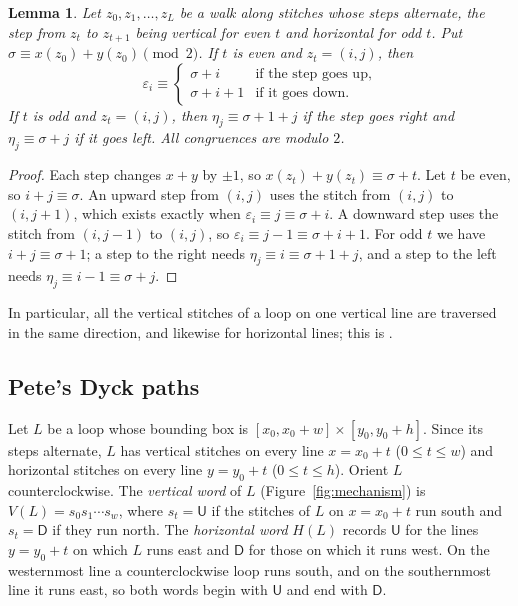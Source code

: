 \documentclass[11pt]{amsart}
\newtheorem{lemma}[theorem]{Lemma}
\theoremstyle{definition}
\theoremstyle{remark}
\newcommand{\U}{\mathsf{U}}
\newcommand{\D}{\mathsf{D}}
\begin{document}
\begin{lemma}\label{lem:walk}
Let $z_0,z_1,\dots,z_L$ be a walk along stitches whose steps alternate, the step from $z_t$ to
$z_{t+1}$ being vertical for even $t$ and horizontal for odd $t$. Put
$\sigma\equiv x(z_0)+y(z_0)\pmod 2$. If $t$ is even and $z_t=(i,j)$, then
\[
\varepsilon_i\equiv\begin{cases}\sigma+i&\text{if the step goes up,}\\ \sigma+i+1&\text{if it goes down.}\end{cases}
\]
If $t$ is odd and $z_t=(i,j)$, then $\eta_j\equiv\sigma+1+j$ if the step goes right and
$\eta_j\equiv\sigma+j$ if it goes left. All congruences are modulo $2$.
\end{lemma}

\begin{proof}
Each step changes $x+y$ by $\pm1$, so $x(z_t)+y(z_t)\equiv\sigma+t$. Let $t$ be even, so $i+j\equiv\sigma$.
An upward step from $(i,j)$ uses the stitch from $(i,j)$ to $(i,j+1)$, which exists exactly when
$\varepsilon_i\equiv j\equiv\sigma+i$. A downward step uses the stitch from $(i,j-1)$ to $(i,j)$, so
$\varepsilon_i\equiv j-1\equiv\sigma+i+1$. For odd $t$ we have $i+j\equiv\sigma+1$; a step to the right
needs $\eta_j\equiv i\equiv\sigma+1+j$, and a step to the left needs $\eta_j\equiv i-1\equiv\sigma+j$.
\end{proof}

In particular, all the vertical stitches of a loop on one vertical line are traversed in the same
direction, and likewise for horizontal lines; this is \cite[Lemma~2.3]{DK24}.

\subsection{Pete's Dyck paths}
Let $L$ be a loop whose bounding box is $[x_0,x_0+w]\times[y_0,y_0+h]$. Since its steps alternate, $L$
has vertical stitches on every line $x=x_0+t$ ($0\le t\le w$) and horizontal stitches on every line
$y=y_0+t$ ($0\le t\le h$). Orient $L$ counterclockwise. The \emph{vertical word} of $L$ (Figure~\ref{fig:mechanism}) is
$V(L)=s_0s_1\cdots s_w$, where $s_t=\U$ if the stitches of $L$ on $x=x_0+t$ run south and $s_t=\D$ if
they run north. The \emph{horizontal word} $H(L)$ records $\U$ for the lines $y=y_0+t$ on which $L$ runs
east and $\D$ for those on which it runs west. On the westernmost line a counterclockwise loop runs
south, and on the southernmost line it runs east, so both words begin with $\U$ and end with $\D$.
\end{document}
